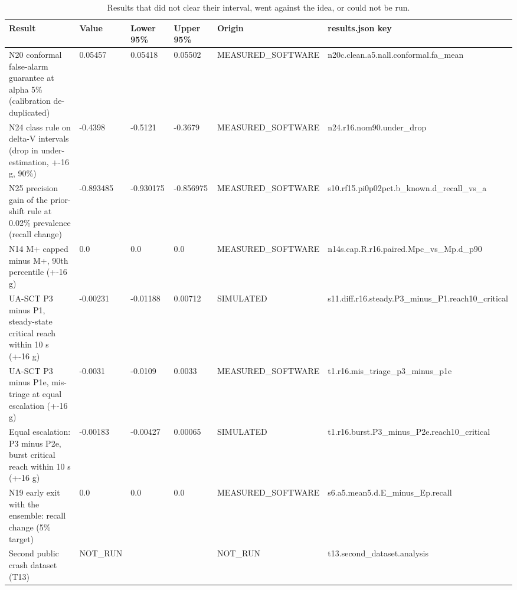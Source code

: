 \begin{table}[t]
\centering
\small
\caption{Results that did not clear their interval, went against the idea, or could not be run.}
\label{tab:tab_null_results}
\begin{tabular}{llllll}
\toprule
Result & Value & Lower 95\% & Upper 95\% & Origin & results.json key \\
\midrule
N20 conformal false-alarm guarantee at alpha 5\% (calibration de-duplicated) & 0.05457 & 0.05418 & 0.05502 & MEASURED\_SOFTWARE & n20c.clean.a5.nall.conformal.fa\_mean \\
N24 class rule on delta-V intervals (drop in under-estimation, +-16 g, 90\%) & -0.4398 & -0.5121 & -0.3679 & MEASURED\_SOFTWARE & n24.r16.nom90.under\_drop \\
N25 precision gain of the prior-shift rule at 0.02\% prevalence (recall change) & -0.893485 & -0.930175 & -0.856975 & MEASURED\_SOFTWARE & s10.rf15.pi0p02pct.b\_known.d\_recall\_vs\_a \\
N14 M+ capped minus M+, 90th percentile (+-16 g) & 0.0 & 0.0 & 0.0 & MEASURED\_SOFTWARE & n14s.cap.R.r16.paired.Mpc\_vs\_Mp.d\_p90 \\
UA-SCT P3 minus P1, steady-state critical reach within 10 s (+-16 g) & -0.00231 & -0.01188 & 0.00712 & SIMULATED & s11.diff.r16.steady.P3\_minus\_P1.reach10\_critical \\
UA-SCT P3 minus P1e, mis-triage at equal escalation (+-16 g) & -0.0031 & -0.0109 & 0.0033 & MEASURED\_SOFTWARE & t1.r16.mis\_triage\_p3\_minus\_p1e \\
Equal escalation: P3 minus P2e, burst critical reach within 10 s (+-16 g) & -0.00183 & -0.00427 & 0.00065 & SIMULATED & t1.r16.burst.P3\_minus\_P2e.reach10\_critical \\
N19 early exit with the ensemble: recall change (5\% target) & 0.0 & 0.0 & 0.0 & MEASURED\_SOFTWARE & s6.a5.mean5.d.E\_minus\_Ep.recall \\
Second public crash dataset (T13) & NOT\_RUN &  &  & NOT\_RUN & t13.second\_dataset.analysis \\
\bottomrule
\end{tabular}
\end{table}
